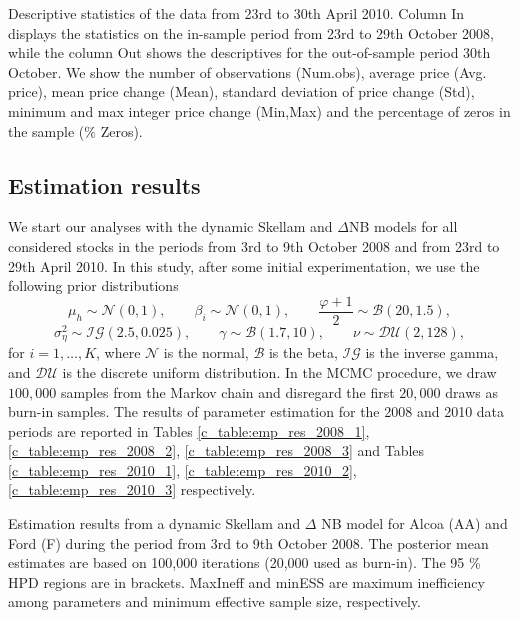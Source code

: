 \documentclass[12pt]{article}
\begin{document}
\begin{table}[!htp]
\begin{center}
\caption{Descriptive statistics of the data  from 23rd to 30th April 2010. Column In displays the statistics on the in-sample period from 23rd to 29th October 2008, while the column Out shows the descriptives for the out-of-sample period 30th October. We show the number of observations (Num.obs), average price (Avg. price), mean price change (Mean), standard deviation of price change (Std), minimum and max integer price change (Min,Max) and the percentage of zeros in the sample ($\%$ Zeros).} 
\begin{small}

\end{small}
\label{c_table:desc2010}
\end{center}
\end{table}

\subsection{Estimation results}

We start our analyses with the dynamic Skellam and $\Delta$NB models
for all considered stocks  in the periods from
3rd to 9th October 2008 and from 23rd to 29th April 2010.
In this study, after some initial experimentation,
we use the following prior distributions
\[
\mu_h \sim \mathcal{N}(0,1), \qquad \beta_i \sim \mathcal{N}(0,1), \qquad
\frac{\varphi+1}2 \sim \mathcal{B}(20,1.5),
\]
\[
\sigma _{\eta}^2\sim \mathcal{IG}(2.5,0.025), \qquad
\gamma \sim \mathcal{B}(1.7,10), \qquad
\nu \sim \mathcal{DU}(2,128),
\]
for $i=1,\ldots,K$,
where $\mathcal{N}$ is the normal, $\mathcal{B}$ is the beta,
$\mathcal{IG}$ is the inverse gamma, and $\mathcal{DU}$ is the discrete uniform
distribution.
In the MCMC procedure, 
we draw $100,000$ samples from the Markov chain and disregard the first $20,000$
draws as burn-in samples.
The results of parameter estimation for the 2008 and 2010 data periods
are reported in Tables \ref{c_table:emp_res_2008_1},  \ref{c_table:emp_res_2008_2}, \ref{c_table:emp_res_2008_3} and Tables
\ref{c_table:emp_res_2010_1}, \ref{c_table:emp_res_2010_2}, \ref{c_table:emp_res_2010_3} respectively.


\begin{table}[htbp]
\begin{center}
\caption{\footnotesize Estimation results from a dynamic Skellam and  $\Delta$ NB model for Alcoa (AA) and Ford (F) 
during the period from 3rd to 9th October 2008.
The posterior mean estimates are based on 100,000 iterations
(20,000 used as burn-in).
The 95 \% HPD regions are in brackets.
MaxIneff and minESS are maximum inefficiency among parameters
and minimum effective sample size, respectively.} 

\label{c_table:emp_res_2008_1}
\end{center}
\end{table} 
\end{document}
